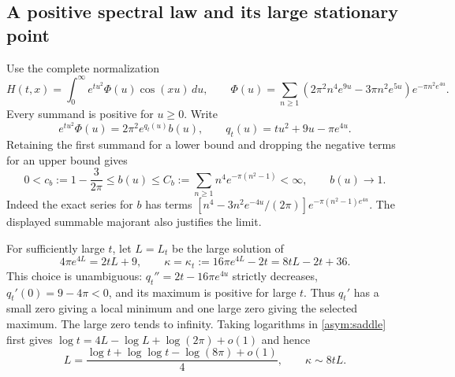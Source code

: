 \documentclass[11pt]{article}
\theoremstyle{definition}
\newcommand{\dd}{\,d}
\begin{document}
\subsection{A positive spectral law and its large stationary point}
Use the complete normalization
\begin{equation}\label{asym:source}
 H(t,x)=\int_0^\infty e^{tu^2}\Phi(u)\cos(xu)\dd u,\qquad
 \Phi(u)=\sum_{n\ge1}(2\pi^2n^4e^{9u}-3\pi n^2e^{5u})
                         e^{-\pi n^2e^{4u}}.
\end{equation}
Every summand is positive for $u\ge0$.  Write
\begin{equation}\label{asym:factor}
 e^{tu^2}\Phi(u)=2\pi^2e^{q_t(u)}b(u),\qquad
 q_t(u)=tu^2+9u-\pi e^{4u}.
\end{equation}
Retaining the first summand for a lower bound and dropping the negative
terms for an upper bound gives
\begin{equation}\label{asym:b-bounds}
 0<c_b:=1-\frac3{2\pi}\le b(u)\le
 C_b:=\sum_{n\ge1}n^4e^{-\pi(n^2-1)}<\infty,
 \qquad b(u)\longrightarrow1.
\end{equation}
Indeed the exact series for $b$ has terms
$[n^4-3n^2e^{-4u}/(2\pi)]e^{-\pi(n^2-1)e^{4u}}$.
The displayed summable majorant also justifies the limit.

For sufficiently large $t$, let $L=L_t$ be the large solution of
\begin{equation}\label{asym:saddle}
 4\pi e^{4L}=2tL+9,
 \qquad \kappa=\kappa_t:=16\pi e^{4L}-2t=8tL-2t+36.
\end{equation}
This choice is unambiguous: $q_t''=2t-16\pi e^{4u}$ strictly decreases,
$q_t'(0)=9-4\pi<0$, and its maximum is positive for large $t$.
Thus $q_t'$ has a small zero giving a local minimum and one large zero
giving the selected maximum.  The large zero tends to infinity.
Taking logarithms in \eqref{asym:saddle} first gives
$\log t=4L-\log L+\log(2\pi)+o(1)$ and hence
\begin{equation}\label{asym:L-expansion}
 L=\frac{\log t+\log\log t-\log(8\pi)+o(1)}4,
 \qquad \kappa\sim8tL.
\end{equation}
\end{document}
